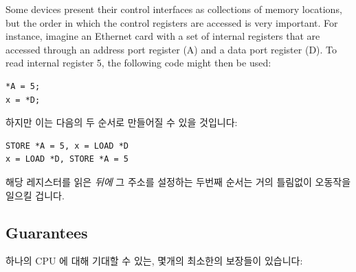 Some devices present their control interfaces as collections of memory
locations, but the order in which the control registers are accessed is very
important.  For instance, imagine an Ethernet card with a set of internal
registers that are accessed through an address port register (A) and a data
port register (D).  To read internal register 5, the following code might then
be used:
\fi

\vspace{5pt}
\begin{minipage}[t]{\columnwidth}
\scriptsize
\begin{verbatim}
*A = 5;
x = *D;
\end{verbatim}
\end{minipage}
\vspace{5pt}

하지만 이는 다음의 두 순서로 만들어질 수 있을 것입니다:

\vspace{5pt}
\begin{minipage}[t]{\columnwidth}
\scriptsize
\begin{verbatim}
STORE *A = 5, x = LOAD *D
x = LOAD *D, STORE *A = 5
\end{verbatim}
\end{minipage}
\vspace{5pt}

해당 레지스터를 읽은 \emph{뒤에} 그 주소를 설정하는 두번째 순서는 거의 틀림없이
오동작을 일으킬 겁니다.

\subsection{Guarantees}
\label{sec:advsync:Guarantees}

하나의 CPU 에 대해 기대할 수 있는, 몇개의 최소한의 보장들이 있습니다:

